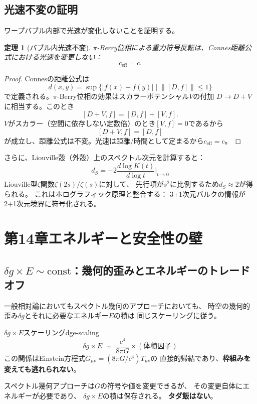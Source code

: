 \documentclass[11pt,a4paper]{article}
\newtheorem{theorem}{定理}[section]
\begin{document}
\subsection{光速不変の証明}
\label{sec:13.5}

ワープバブル内部で光速が変化しないことを証明する。

\begin{theorem}[バブル内光速不変]
$\pi$-Berry位相による重力符号反転は、Connes距離公式における光速を変更しない：
\[
c_{\mathrm{eff}} = c.
\]
\end{theorem}

\begin{proof}
Connesの距離公式は
\[
d(x,y) = \sup\bigl\{ |f(x) - f(y)| \;\big|\; \| [D, f] \| \leq 1 \bigr\}
\]
で定義される。$\pi$-Berry位相の効果はスカラーポテンシャル$V$の付加
$D \to D + V$に相当する。このとき
\[
[D + V, f] = [D, f] + [V, f].
\]
$V$がスカラー（空間に依存しない定数倍）のとき$[V, f] = 0$であるから
\[
[D + V, f] = [D, f]
\]
が成立し、距離公式は不変。光速は距離/時間として定まるから$c_{\mathrm{eff}} = c$。
\end{proof}

\noindent
さらに、Liouville殻（外殻）上のスペクトル次元を計算すると：
\[
d_S = -2\frac{d\log K(t)}{d\log t}\bigg|_{t\to 0}
\]
Liouville型$\zeta$関数$\zeta(2s)/\zeta(s)$に対して、
先行項が$s^2$に比例するため$d_S \approx 2$が得られる。
これはホログラフィック原理と整合する：
3+1次元バルクの情報が2+1次元境界に符号化される。



\section{第14章\quad エネルギーと安全性の壁}
\label{ch:energy-safety}

\subsection{$\delta g \times E \sim \mathrm{const}$：幾何的歪みとエネルギーのトレードオフ}
\label{sec:14.1}

一般相対論においてもスペクトル幾何のアプローチにおいても、
時空の幾何的歪み$\delta g$とそれに必要なエネルギー$E$の積は
同じスケーリングに従う。

\begin{keyresult}{$\delta g \times E$スケーリング}{dge-scaling}
\[
\delta g \times E \;\sim\; \frac{c^4}{8\pi G} \times (\text{体積因子})
\]
この関係はEinstein方程式$G_{\mu\nu} = (8\pi G/c^4) T_{\mu\nu}$の
直接的帰結であり、\textbf{枠組みを変えても逃れられない}。

スペクトル幾何アプローチは$G$の符号や値を変更できるが、
その変更自体にエネルギーが必要であり、
$\delta g \times E$の積は保存される。
\textbf{タダ飯はない}。
\end{keyresult}
\end{document}

